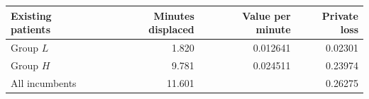 \begin{tabular*}{\linewidth}{@{\extracolsep{\fill}}lrrr@{}}\toprule
Existing patients & Minutes displaced & Value per minute & Private loss\\
\midrule
Group $L$ & 1.820 & 0.012641 & 0.02301\\
Group $H$ & 9.781 & 0.024511 & 0.23974\\
\midrule
All incumbents & 11.601 & & 0.26275\\
\bottomrule
\end{tabular*}
